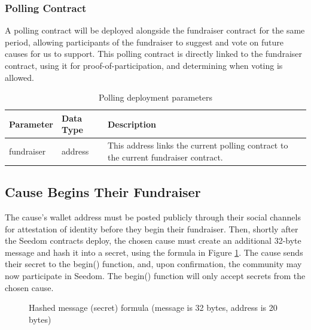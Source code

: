 \documentclass[11pt]{article}
\begin{document}
\subsubsection{Polling Contract}

A polling contract will be deployed alongside the fundraiser contract for the same period, allowing participants of the fundraiser to suggest and vote on future causes for us to support. This polling contract is directly linked to the fundraiser contract, using it for proof-of-participation, and determining when voting is allowed.

\begin{table}[H]
\begin{center}
\begin{tabular}{| l | l | p{32em} |}
\hline
\textbf{Parameter} & \textbf{Data Type} & \textbf{Description} \\ \hline
fundraiser & address & This address links the current polling contract to the current fundraiser contract. \\ \hline
\end{tabular}
\caption{Polling deployment parameters}
\label{tab:pollingDeploymentParameters}
\end{center}
\end{table}

\subsection{Cause Begins Their Fundraiser}

The cause's wallet address must be posted publicly through their social channels for attestation of identity before they begin their fundraiser. Then, shortly after the Seedom contracts deploy, the chosen cause must create an additional 32-byte message and hash it into a secret, using the formula in Figure \ref{figure:secretGenerationFormula}. The cause sends their secret to the begin() function, and, upon confirmation, the community may now participate in Seedom. The begin() function will only accept secrets from the chosen cause.

\begin{figure}[H]
\begin{center}
\caption{Hashed message (secret) formula (message is 32 bytes, address is 20 bytes)}
\label{figure:secretGenerationFormula}
\end{center}
\end{figure}
\end{document}
